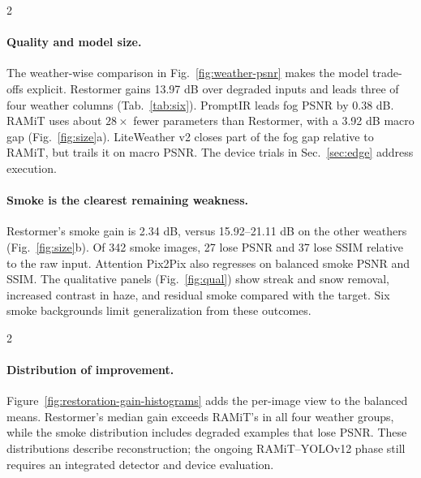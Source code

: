 \begin{multicols}{2}\raggedcolumns
\paragraph{Quality and model size.}
The weather-wise comparison in Fig.~\ref{fig:weather-psnr} makes the model trade-offs explicit. Restormer gains 13.97 dB over degraded inputs and leads three of four weather columns (Tab.~\ref{tab:six}). PromptIR leads fog PSNR by 0.38 dB. RAMiT uses about $28\times$ fewer parameters than Restormer, with a 3.92 dB macro gap (Fig.~\ref{fig:size}a). LiteWeather v2 closes part of the fog gap relative to RAMiT, but trails it on macro PSNR. The device trials in Sec.~\ref{sec:edge} address execution.

\paragraph{Smoke is the clearest remaining weakness.}
Restormer's smoke gain is 2.34 dB, versus 15.92--21.11 dB on the other weathers (Fig.~\ref{fig:size}b). Of 342 smoke images, 27 lose PSNR and 37 lose SSIM relative to the raw input. Attention Pix2Pix also regresses on balanced smoke PSNR and SSIM. The qualitative panels (Fig.~\ref{fig:qual}) show streak and snow removal, increased contrast in haze, and residual smoke compared with the target. Six smoke backgrounds limit generalization from these outcomes.
\end{multicols}
\clearpage
\noindent\begin{minipage}{\linewidth}
\centering
{}
\label{fig:restoration-gain-histograms}
\end{minipage}
\begin{multicols}{2}\raggedcolumns
\paragraph{Distribution of improvement.}
Figure~\ref{fig:restoration-gain-histograms} adds the per-image view to the
balanced means. Restormer's median gain exceeds RAMiT's in all four weather
groups, while the smoke distribution includes degraded examples that lose
PSNR. These distributions describe reconstruction; the ongoing RAMiT--YOLOv12
phase still requires an integrated detector and device evaluation.
\end{multicols}
